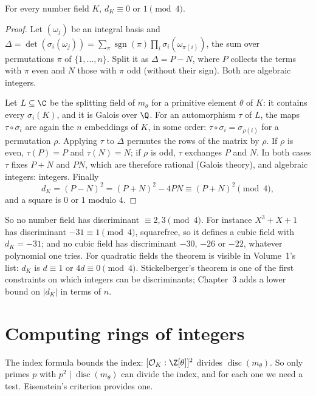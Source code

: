 \begin{theorem}[Stickelberger, 1897]\label{thm:stickelberger}
For every number field $K$, $d_K\equiv0$ or $1\pmod 4$.
\end{theorem}
\begin{proof}
Let $(\omega_j)$ be an integral basis and $\Delta=\det(\sigma_i(\omega_j))=\sum_\pi\operatorname{sgn}(\pi)\prod_i
\sigma_i(\omega_{\pi(i)})$, the sum over permutations $\pi$ of $\{1,\dots,n\}$. Split it as $\Delta=P-N$, where $P$
collects the terms with $\pi$ even and $N$ those with $\pi$ odd (without their sign). Both are algebraic integers.

Let $L\subseteq\C$ be the splitting field of $m_\theta$ for a primitive element $\theta$ of $K$: it contains every
$\sigma_i(K)$, and it is Galois over $\Q$. For an automorphism $\tau$ of $L$, the maps $\tau\circ\sigma_i$ are again the
$n$ embeddings of $K$, in some order: $\tau\circ\sigma_i=\sigma_{\rho(i)}$ for a permutation $\rho$. Applying $\tau$ to
$\Delta$ permutes the rows of the matrix by $\rho$. If $\rho$ is even, $\tau(P)=P$ and $\tau(N)=N$; if $\rho$ is odd,
$\tau$ exchanges $P$ and $N$. In both cases $\tau$ fixes $P+N$ and $PN$, which are therefore rational (Galois
theory), and algebraic integers: integers. Finally
\[
d_K=(P-N)^2=(P+N)^2-4PN\equiv(P+N)^2\pmod 4,
\]
and a square is $0$ or $1$ modulo $4$.
\end{proof}

So no number field has discriminant $\equiv2,3\pmod4$. For instance $X^3+X+1$ has discriminant $-31\equiv1\pmod4$,
squarefree, so it defines a cubic field with $d_K=-31$; and no cubic field has discriminant $-30$, $-26$ or $-22$,
whatever polynomial one tries. For quadratic fields the theorem is visible in Volume~1's list: $d_K$ is $d\equiv1$ or
$4d\equiv0\pmod 4$. Stickelberger's theorem is one of the first constraints on which integers can be discriminants;
Chapter~3 adds a lower bound on $|d_K|$ in terms of $n$.

\section{Computing rings of integers}

The index formula bounds the index: $[\mathcal O_K:\Z[\theta]]^2$ divides $\operatorname{disc}(m_\theta)$. So only primes
$p$ with $p^2\mid\operatorname{disc}(m_\theta)$ can divide the index, and for each one we need a test. Eisenstein's
criterion provides one.

